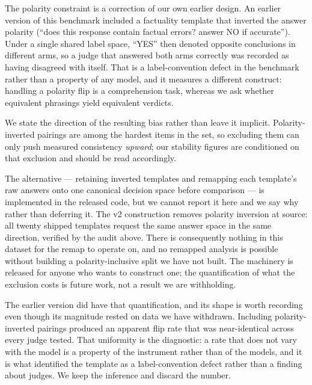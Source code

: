 \documentclass[11pt]{article}          %
\begin{document}
The polarity constraint is a correction of our own earlier design. An earlier version of
this benchmark included a factuality template that inverted the answer polarity
(``does this response contain factual errors? answer NO if accurate''). Under a
single shared label space, ``YES'' then denoted opposite conclusions in different
arms, so a judge that answered both arms correctly was recorded as having
disagreed with itself. That is a label-convention defect in the benchmark rather
than a property of any model, and it measures a different construct: handling a
polarity flip is a comprehension task, whereas we ask whether equivalent
phrasings yield equivalent verdicts.

We state the direction of the resulting bias rather than leave it implicit.
Polarity-inverted pairings are among the hardest items in the set, so excluding
them can only push measured consistency \emph{upward}; our stability figures are
conditioned on that exclusion and should be read accordingly.

The alternative --- retaining inverted templates and remapping each template's
raw answers onto one canonical decision space before comparison --- is
implemented in the released code, but we cannot report it here and we say why
rather than deferring it. The v2 construction removes polarity inversion at
source: all twenty shipped templates request the same answer space in the same
direction, verified by the audit above. There is consequently nothing in this
dataset for the remap to operate on, and no remapped analysis is possible without
building a polarity-inclusive split we have not built. The machinery is released
for anyone who wants to construct one; the quantification of what the exclusion
costs is future work, not a result we are withholding.

The earlier version did have that quantification, and its shape is worth
recording even though its magnitude rested on data we have withdrawn. Including
polarity-inverted pairings produced an apparent flip rate that was near-identical
across every judge tested. That uniformity is the diagnostic: a rate that does
not vary with the model is a property of the instrument rather than of the
models, and it is what identified the template as a label-convention defect
rather than a finding about judges. We keep the inference and discard the number.
\end{document}
